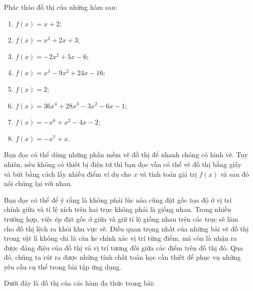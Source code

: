 \exercise Phác thảo đồ thị của những hàm sau:
\begin{multicols}{2}
   \begin{enumerate}
      \item $f(x) = x + 2$; 
      \item $f(x) = x^2 + 2x + 3$;
      \item $f(x) = -2x^2 + 5x - 6$;
      \item $f(x) = x^3 - 9x^2 + 24x - 16$;
      \item $f(x) = 2$;
      \item $f(x) = 36x^4 + 28x^3 - 3x^2 - 6x - 1$;
      \item $f(x) = -x^6 + x^2 - 4x - 2$;
      \item $f(x) = -x^7 + x$.
   \end{enumerate}
\end{multicols}

\solution

Bạn đọc có thể dùng những phần mềm vẽ đồ thị để nhanh chóng có hình vẽ. Tuy nhiên, nếu không có thiết bị điện tử thì bạn đọc vẫn có thể vẽ đồ thị bằng giấy và bút bằng cách lấy nhiều điểm ví dụ cho $x$ và tính toán giá trị $f(x)$ và sau đó nối chúng lại với nhau.

Bạn đọc có thể để ý rằng là không phải lúc nào cũng đặt gốc tọa độ ở vị trí chính giữa và tỉ lệ xích trên hai trục không phải là giống nhau. Trong nhiều trường hợp, việc ép đặt gốc ở giữa và giữ tỉ lệ giống nhau trên các trục sẽ làm cho đồ thị lệch ra khỏi khu vực vẽ. Điều quan trọng nhất của những bài vẽ đồ thị trong vật lí không chỉ là căn ke chính xác vị trí từng điểm, mà còn là nhận ra được dáng điệu của đồ thị và vị trí tương đối giữa các điểm trên đồ thị đó. Qua đó, chúng ta rút ra được những tính chất toán học cần thiết để phục vụ những yêu cầu cụ thể trong bài tập ứng dụng.

Dưới đây là đồ thị của các hàm đa thức trong bài:

